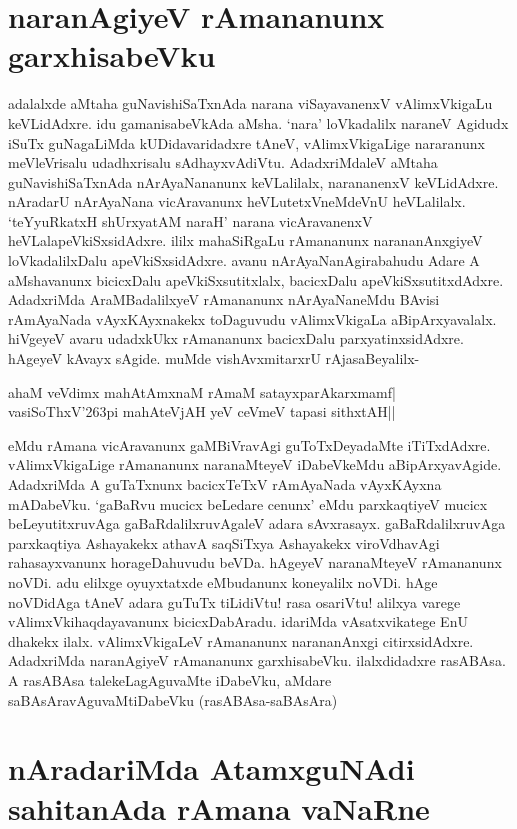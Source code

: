 \section*{naranAgiyeV rAmananunx garxhisabeVku} 


adalalxde aMtaha guNavishiSaTxnAda narana viSayavanenxV vAlimxVkigaLu keVLidAdxre. idu gamanisabeVkAda aMsha. `nara' loVkadalilx naraneV Agidudx iSuTx guNagaLiMda kUDidavaridadxre tAneV, vAlimxVkigaLige nararanunx meVleVrisalu udadhxrisalu sAdhayxvAdiVtu. AdadxriMdaleV aMtaha guNavishiSaTxnAda nArAyaNananunx keVLalilalx, narananenxV keVLidAdxre. nAradarU nArAyaNana vicAravanunx heVLutetxVneMdeVnU heVLalilalx. `teYyuRkatxH shUrxyatAM naraH' narana vicAravanenxV heVLalapeVkiSxsidAdxre. ililx mahaSiRgaLu rAmananunx narananAnxgiyeV loVkadalilxDalu apeVkiSxsidAdxre. avanu nArAyaNanAgirabahudu Adare A aMshavanunx bicicxDalu apeVkiSxsutitxlalx, bacicxDalu apeVkiSxsutitxdAdxre. AdadxriMda AraMBadalilxyeV rAmananunx nArAyaNaneMdu BAvisi rAmAyaNada vAyxKAyxnakekx toDaguvudu vAlimxVkigaLa aBipArxyavalalx. hiVgeyeV avaru udadxkUkx rAmananunx bacicxDalu parxyatinxsidAdxre. hAgeyeV kAvayx sAgide. muMde vishAvxmitarxrU rAjasaBeyalilx- 

\begin{shloka} 
ahaM veVdimx mahAtAmxnaM rAmaM satayxparAkarxmamf|\label{195}\\ 
vasiSoThxV\char'263pi mahAteVjAH yeV ceVmeV tapasi sithxtAH||
\end{shloka}
eMdu rAmana vicAravanunx gaMBiVravAgi guToTxDeyadaMte iTiTxdAdxre. vAlimxVkigaLige rAmananunx naranaMteyeV iDabeVkeMdu aBipArxyavAgide. AdadxriMda A guTaTxnunx bacicxTeTxV rAmAyaNada vAyxKAyxna mADabeVku. `gaBaRvu mucicx beLedare cenunx' eMdu parxkaqtiyeV mucicx beLeyutitxruvAga gaBaRdalilxruvAgaleV adara sAvxrasayx. gaBaRdalilxruvAga parxkaqtiya Ashayakekx athavA saqSiTxya Ashayakekx viroVdhavAgi rahasayxvanunx horageDahuvudu beVDa. hAgeyeV naranaMteyeV rAmananunx noVDi. adu elilxge oyuyxtatxde eMbudanunx koneyalilx noVDi. hAge noVDidAga tAneV adara guTuTx tiLidiVtu! rasa osariVtu! alilxya varege vAlimxVkihaqdayavanunx bicicxDabAradu. idariMda vAsatxvikatege EnU dhakekx ilalx. vAlimxVkigaLeV rAmananunx narananAnxgi citirxsidAdxre. AdadxriMda naranAgiyeV rAmananunx garxhisabeVku. ilalxdidadxre rasABAsa. A rasABAsa talekeLagAguvaMte iDabeVku, aMdare saBAsAravAguvaMtiDabeVku (rasABAsa-saBAsAra) 

\section*{nAradariMda AtamxguNAdi sahitanAda rAmana vaNaRne} 

